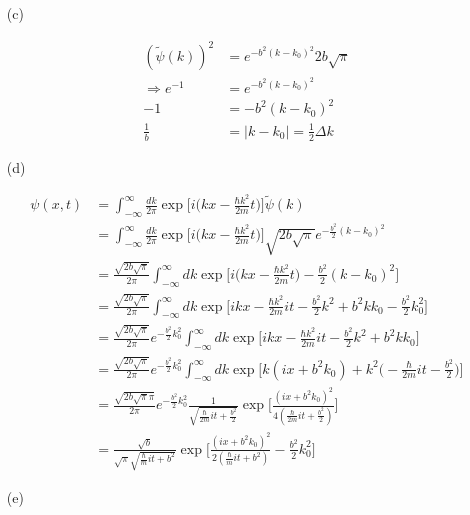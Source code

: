 \documentclass[11pt,a4paper]{article}
\begin{document}
\begin{enumerate}
\item[(c)]

\begin{align}
    (\tilde{\psi}(k))^2&=e^{-b^2(k-k_0)^2}2b\sqrt{\pi}\\
    \Rightarrow e^{-1}&=e^{-b^2(k-k_0)^2}\\
    -1&=-b^2(k-k_0)^2\\
    \frac{1}{b}&=|k-k_0|=\frac{1}{2}\Delta k
\end{align}
\item[(d)]

\begin{align}
    \psi(x,t)
    &=\int^\infty_{-\infty} \frac{dk}{2\pi}\exp{\bigg[i\Big(kx-\frac{\hbar k^2}{2m}t\Big)\bigg]}\tilde{\psi}(k)\\
    &=\int^\infty_{-\infty} \frac{dk}{2\pi}\exp{\bigg[i\Big(kx-\frac{\hbar k^2}{2m}t\Big)\bigg]}\sqrt{2b\sqrt{\pi}}e^{-\frac{b^2}{2}(k-k_0)^2}\\
    &=\frac{\sqrt{2b\sqrt{\pi}}}{2\pi}\int^\infty_{-\infty} dk\exp{\bigg[i\Big(kx-\frac{\hbar k^2}{2m}t\Big)-\frac{b^2}{2}(k-k_0)^2\bigg]}\\
    &=\frac{\sqrt{2b\sqrt{\pi}}}{2\pi}\int^\infty_{-\infty} dk\exp{\bigg[ikx-\frac{\hbar k^2}{2m}it-\frac{b^2}{2}k^2+b^2kk_0-\frac{b^2}{2}k_0^2\bigg]}\\
    &=\frac{\sqrt{2b\sqrt{\pi}}}{2\pi}e^{-\frac{b^2}{2}k_0^2}\int^\infty_{-\infty} dk\exp{\bigg[ikx-\frac{\hbar k^2}{2m}it-\frac{b^2}{2}k^2+b^2kk_0\bigg]}\\
    &=\frac{\sqrt{2b\sqrt{\pi}}}{2\pi}e^{-\frac{b^2}{2}k_0^2}\int^\infty_{-\infty} dk\exp{\bigg[k(ix+b^2k_0)+k^2\Big(-\frac{\hbar}{2m}it-\frac{b^2}{2}\Big)\bigg]}\\
    &=\frac{\sqrt{2b\sqrt{\pi}\pi}}{2\pi}e^{-\frac{b^2}{2}k_0^2}\frac{1}{\sqrt{\frac{\hbar}{2m}it+\frac{b^2}{2}}}\exp{\bigg[\frac{(ix+b^2k_0)^2}{4(\frac{\hbar}{2m}it+\frac{b^2}{2})}\bigg]}\\
    &=\frac{\sqrt{b}}{\sqrt{\pi}\sqrt{\frac{\hbar}{m}it+b^2}}\exp{\bigg[\frac{(ix+b^2k_0)^2}{2(\frac{\hbar}{m}it+b^2)}-\frac{b^2}{2}k_0^2\bigg]}
\end{align}

\item[(e)]

\end{enumerate}
\end{document}
